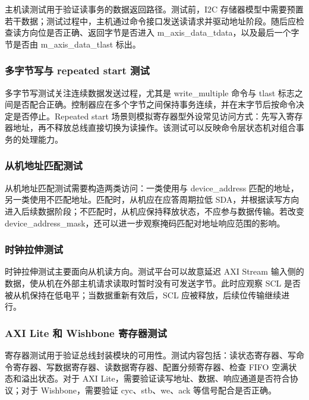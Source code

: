 \documentclass[12pt,a4paper]{article}
\numberwithin{equation}{section}
\begin{document}
主机读测试用于验证读事务的数据返回路径。测试前，I2C
存储器模型中需要预置若干数据；测试过程中，主机通过命令接口发送读请求并驱动地址阶段。随后应检查读方向位是否正确、返回字节是否进入
m\_axis\_data\_tdata，以及最后一个字节是否由
m\_axis\_data\_tlast 标出。

\subsubsection{多字节写与 repeated start
测试}\label{ux591aux5b57ux8282ux5199ux4e0e-repeated-start-ux6d4bux8bd5}

多字节写测试关注连续数据发送过程，尤其是
write\_multiple 命令与
tlast
标志之间是否配合正确。控制器应在多个字节之间保持事务连续，并在末字节后按命令决定是否停止。Repeated
start
场景则模拟寄存器型外设常见访问方式：先写入寄存器地址，再不释放总线直接切换为读操作。该测试可以反映命令层状态机对组合事务的处理能力。

\subsubsection{从机地址匹配测试}\label{ux4eceux673aux5730ux5740ux5339ux914dux6d4bux8bd5}

从机地址匹配测试需要构造两类访问：一类使用与
device\_address
匹配的地址，另一类使用不匹配地址。匹配时，从机应在应答周期拉低
SDA，并根据读写方向进入后续数据阶段；不匹配时，从机应保持释放状态，不应参与数据传输。若改变
device\_address\_mask，还可以进一步观察掩码匹配对地址响应范围的影响。

\subsubsection{时钟拉伸测试}\label{ux65f6ux949fux62c9ux4f38ux6d4bux8bd5}

时钟拉伸测试主要面向从机读方向。测试平台可以故意延迟 AXI Stream
输入侧的数据，使从机在外部主机请求读取时暂时没有可发送字节。此时应观察
SCL 是否被从机保持在低电平；当数据重新有效后，SCL
应被释放，后续位传输继续进行。

\subsubsection{AXI Lite 和 Wishbone
寄存器测试}\label{axi-lite-ux548c-wishbone-ux5bc4ux5b58ux5668ux6d4bux8bd5}

寄存器测试用于验证总线封装模块的可用性。测试内容包括：读状态寄存器、写命令寄存器、写数据寄存器、读数据寄存器、配置分频寄存器、检查
FIFO 空满状态和溢出状态。对于 AXI
Lite，需要验证读写地址、数据、响应通道是否符合协议；对于
Wishbone，需要验证
cyc、stb、we、ack
等信号配合是否正确。
\end{document}
